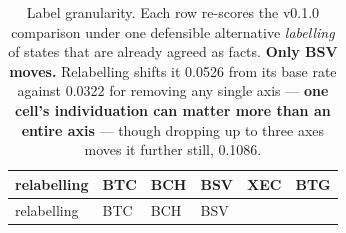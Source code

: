 \documentclass[
]{article}
\begin{document}
\begin{longtable}[]{@{}
  >{\raggedright\arraybackslash}p{}
  >{\raggedleft\arraybackslash}p{}
  >{\raggedleft\arraybackslash}p{}
  >{\raggedleft\arraybackslash}p{}
  >{\raggedleft\arraybackslash}p{}
  >{\raggedleft\arraybackslash}p{}@{}}
\caption{Label granularity. Each row re-scores the v0.1.0 comparison
under one defensible alternative \emph{labelling} of states that are
already agreed as facts. \textbf{Only BSV moves.} Relabelling shifts it
0.0526 from its base rate against 0.0322 for removing any single axis
--- \textbf{one cell's individuation can matter more than an entire
axis} --- though dropping up to three axes moves it further still,
0.1086.}\tabularnewline
\toprule\noalign{}
\begin{minipage}[b]{\linewidth}\raggedright
relabelling
\end{minipage} & \begin{minipage}[b]{\linewidth}\raggedleft
BTC
\end{minipage} & \begin{minipage}[b]{\linewidth}\raggedleft
BCH
\end{minipage} & \begin{minipage}[b]{\linewidth}\raggedleft
BSV
\end{minipage} & \begin{minipage}[b]{\linewidth}\raggedleft
XEC
\end{minipage} & \begin{minipage}[b]{\linewidth}\raggedleft
BTG
\end{minipage} \\
\midrule\noalign{}
\endfirsthead
\toprule\noalign{}
\begin{minipage}[b]{\linewidth}\raggedright
relabelling
\end{minipage} & \begin{minipage}[b]{\linewidth}\raggedleft
BTC
\end{minipage} & \begin{minipage}[b]{\linewidth}\raggedleft
BCH
\end{minipage} & \begin{minipage}[b]{\linewidth}\raggedleft
BSV
\end{minipage} & \begin{minipage}[b]{\linewidth}\raggedleft

\end{minipage}
\end{longtable}
\end{document}
